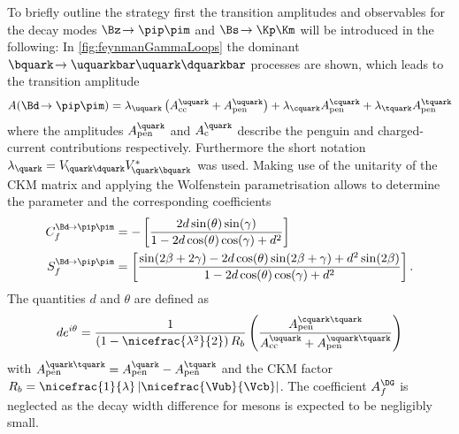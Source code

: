 To briefly outline the strategy first the transition amplitudes and \CP observables for the decay modes $\Bz\!\to\pip\pim$ and $\Bs\!\to\Kp\Km$ will be introduced in the following:
In \cref{fig:feynmanGammaLoops} the dominant $\bquark\!\to\uquarkbar\uquark\dquarkbar$ processes are shown, which leads to the transition amplitude
\begin{equation}
A\!\left(\Bd\!\to\pip\pim\right)=\lambda_\uquark\left(A_{\text{cc}}^\uquark+A_{\text{pen}}^\uquark\right)+\lambda_\cquark A_{\text{pen}}^\cquark+\lambda_\tquark A_{\text{pen}}^\tquark
\end{equation}
where the amplitudes $A_{\text{pen}}^\quark$ and $A_{\text{c}}^\quark$ describe the penguin and charged-current contributions respectively.
Furthermore the short notation $\lambda_\quark=V_{{\kern -0.1em}\quark\dquark}V^{*}_{{\kern -0.1em}\quark\bquark}$ was used.
Making use of the unitarity of the CKM matrix and applying the Wolfenstein parametrisation \cite{Wolfenstein:1983yz} allows to determine the parameter \Lf and the corresponding \CP coefficients
\begin{equation}
\begin{aligned}
C_{f}^{\Bd\!\to\pip\pim}&=-\left[\frac{2d\sin\!\left(\theta\right)\sin\!\left(\gamma\right)}{1-2d\cos\!\left(\theta\right)\cos\!\left(\gamma\right)+d^2}\right]\\
S_{f}^{\Bd\!\to\pip\pim}&=\left[\frac{\sin\!\left(2\beta+2\gamma\right)-2d\cos\!\left(\theta\right)\sin\!\left(2\beta+\gamma\right)+d^2\sin\!\left(2\beta\right)}{1-2d\cos\!\left(\theta\right)\cos\!\left(\gamma\right)+d^2}\right].
\end{aligned}
\end{equation}
The quantities $d$ and $\theta$ are defined as
\begin{equation}
de^{i\theta}=\frac{1}{\left(1-\nicefrac{\lambda^2}{2}\right)R_b}\left(\frac{A_{\text{pen}}^{\cquark\tquark}}{A_{\text{cc}}^{\uquark}+A_{\text{pen}}^{\uquark\tquark}}\right)
\end{equation}
with $A_{\text{pen}}^{\quark\tquark}=A_{\text{pen}}^{\quark}-A_{\text{pen}}^{\tquark}$ and the CKM factor $R_b=\nicefrac{1}{\lambda}\left|\nicefrac{\Vub}{\Vcb}\right|$.
The \CP coefficient $A_f^{\DG}$ is neglected as the decay width difference for \Bd mesons is expected to be negligibly small.


